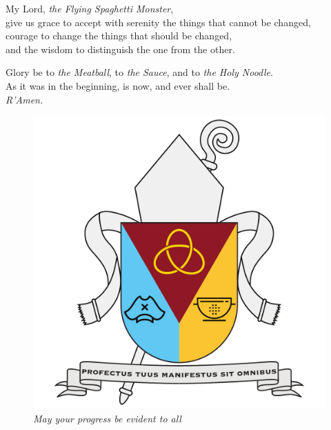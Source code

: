 \documentclass[11pt, a4paper, onecolumn, oneside]{report}
\begin{document}
        \begin{center}
            My Lord, \textit{the Flying Spaghetti Monster},\\
            give us grace to accept with serenity the things that cannot be changed,\\
            courage to change the things that should be changed,\\
            and the wisdom to distinguish the one from the other.

            \medspace

            Glory be to \textit{the Meatball}, to \textit{the Sauce}, and to \textit{the Holy Noodle}. \\
            As it was in the beginning, is now, and ever shall be. \\
            \textit{R'Amen.}
        \end{center}

        \begin{figure}[hp]
            \centering
            \includegraphics[width=10 cm]{Figures/Coat of arms.pdf}
            \caption*{\textit{May your progress be evident to all}}
        \end{figure}
    \clearpage

\hbox{ }
\thispagestyle{empty}
\clearpage
\end{document}

